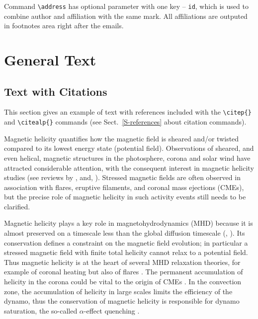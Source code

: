 \documentclass[namedreferences,hyperref,optionalrh,solaromanenum]{spr-sola}
\begin{document}
Command \verb+\address+ has optional parameter  with one key -- \texttt{id}, which is used to combine author and affiliation with the same mark.
All affiliations are outputed in footnotes area right after the emails.
 
\section{General Text} %
      \label{S-general}      

\subsection{Text with Citations} %
  \label{S-text}
This section gives an example of text with references 
included with the \verb+\citep{}+ and \verb+\citealp{}+ commands
(see Sect.~\ref{S-references} about citation commands).

Magnetic helicity quantifies how the magnetic field is sheared
and/or twisted compared to its lowest energy state (potential
field). Observations of sheared, and even helical, magnetic
structures in the photosphere, corona and solar wind have
attracted considerable attention, with the consequent interest in
magnetic helicity studies (see reviews by \citealp{Brown99}, and,
\citealp{Berger03}). Stressed magnetic fields are often observed
in association with flares, eruptive filaments, and coronal mass
ejections (CMEs), but the precise role of magnetic helicity in
such activity events still needs to be clarified.

Magnetic helicity plays a key role in magnetohydrodynamics (MHD)
because it is almost preserved on a timescale less than the global
diffusion timescale (\citealp{Berger84}, \citeyear{Berger03}).  
Its conservation defines a
constraint on the magnetic field evolution; in particular a
stressed magnetic field with finite total helicity cannot relax to
a potential field.  Thus magnetic helicity is at the heart of
several MHD relaxation theories, for example of coronal heating
\citep{Heyvaerts84} but also of flares \citep{Kusano04,Melrose04}.
The permanent accumulation of helicity in the corona could be
vital to the origin of CMEs \citep{Rust94,Low97}.  In the
convection zone, the accumulation of helicity in large scales
limits the efficiency of the dynamo, thus the conservation of
magnetic helicity is responsible for dynamo saturation, the
so-called $\alpha$-effect quenching \citep{Brandenburg01}.
\end{document}
